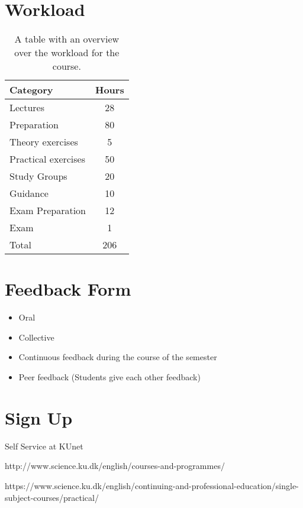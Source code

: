 \section{Workload}
\begin{table}
    \centering
    \caption{A table with an overview over the workload for the course.}
    \label{tab:workload}
    \begin{tabular}{ l | c}
        \textbf{Category} & \textbf{Hours} \\ 
        \hline
        Lectures & 28 \\ 
        Preparation & 80 \\
        Theory exercises & 5 \\ 
        Practical exercises & 50 \\ 
        Study Groups & 20 \\
        Guidance & 10 \\
        Exam Preparation & 12 \\
        Exam & 1 \\ 
        \hline
        Total & 206 \\ 
    \end{tabular}
\end{table}

\section{Feedback Form}
\begin{highlight}
    \begin{itemize}
        \item Oral
        \item Collective
        \item Continuous feedback during the course of the semester
        \item Peer feedback (Students give each other feedback)
    \end{itemize}
\end{highlight}

\section{Sign Up}
Self Service at KUnet

http://www.science.ku.dk/english/courses-and-programmes/

https://www.science.ku.dk/english/continuing-and-professional-education/single-subject-courses/practical/

